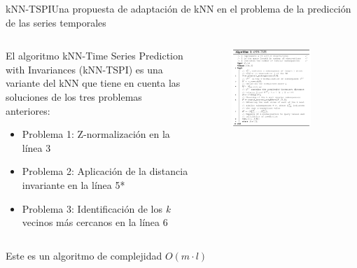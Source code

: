 \documentclass[12pt, aspectratio=169]{beamer} %
\begin{document}
\begin{frame}{kNN-TSPI}{Una propuesta de adaptación de kNN en el problema de la predicción de las series temporales}
  \begin{columns}
    \begin{column}{0.5\textwidth}
      El algoritmo kNN-Time Series Prediction with Invariances (kNN-TSPI) es una variante del kNN que tiene en cuenta las soluciones de los tres problemas anteriores:

      \begin{itemize}
      \item Problema 1: Z-normalización en la línea 3
      \item Problema 2: Aplicación de la distancia invariante en la línea 5*
      \item Problema 3: Identificación de los \textit{k} vecinos más cercanos en la línea 6
      \end{itemize}
      
    \end{column}
    \begin{column}{0.5\textwidth}
        \begin{figure}
          \includegraphics[width=0.8\textwidth]{20210313_2_algoritmo.png}
          \label{fig:algoritmo}
        \end{figure}
    \end{column}                
  \end{columns}
  Este es un algoritmo de complejidad $O(m\cdot l)$
  
\end{frame}
\end{document}
